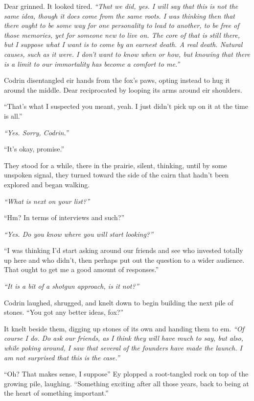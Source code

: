 Dear grinned. It looked tired. \emph{``That we did, yes. I will say that this is not the same idea, though it does come from the same roots. I was thinking then that there ought to be some way for one personality to lead to another, to be free of those memories, yet for someone new to live on. The core of that is still there, but I suppose what I want is to come by an earnest death. A real death. Natural causes, such as it were. I don't want to know when or how, but knowing that there is a limit to our immortality has become a comfort to me.''}

Codrin disentangled eir hands from the fox's paws, opting instead to hug it around the middle. Dear reciprocated by looping its arms around eir shoulders.

``That's what I suspected you meant, yeah. I just didn't pick up on it at the time is all.''

\emph{``Yes. Sorry, Codrin.''}

``It's okay, promise.''

They stood for a while, there in the prairie, silent, thinking, until by some unspoken signal, they turned toward the side of the cairn that hadn't been explored and began walking.

\emph{``What is next on your list?''}

``Hm? In terms of interviews and such?''

\emph{``Yes. Do you know where you will start looking?''}

``I was thinking I'd start asking around our friends and see who invested totally up here and who didn't, then perhaps put out the question to a wider audience. That ought to get me a good amount of responses.''

\emph{``It is a bit of a shotgun approach, is it not?''}

Codrin laughed, shrugged, and knelt down to begin building the next pile of stones. ``You got any better ideas, fox?''

It knelt beside them, digging up stones of its own and handing them to em. \emph{``Of course I do. Do ask our friends, as I think they will have much to say, but also, while poking around, I saw that several of the founders have made the launch. I am not surprised that this is the case.''}

``Oh? That makes sense, I suppose'' Ey plopped a root-tangled rock on top of the growing pile, laughing. ``Something exciting after all those years, back to being at the heart of something important.''

